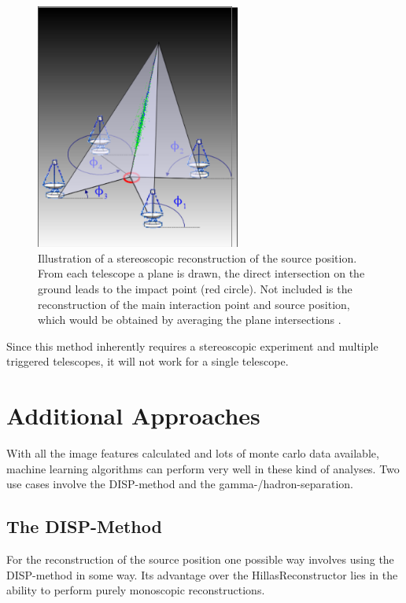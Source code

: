 \begin{figure}
	\centering
	\includegraphics[width=0.6\textwidth]{images/hillas_reco.png}
	\caption{Illustration of a stereoscopic reconstruction of the source position.
    From each telescope a plane is drawn, the direct intersection 
    on the ground leads to the impact point (red circle).
    Not included is the reconstruction of the main interaction point
    and source position, which would be obtained by averaging the plane
    intersections  \cite{hillas_reco}.}
	\label{fig:hillas_reconstructor}
\end{figure}

Since this method inherently requires a stereoscopic experiment
and multiple triggered telescopes, it will not work for a single telescope.




\section{Additional Approaches}
With all the image features calculated and lots of monte carlo
data available, machine learning algorithms can perform
very well in these kind of analyses.
Two use cases involve the DISP-method
and the gamma-/hadron-separation.

\subsection{The DISP-Method}
For the reconstruction of the source position
one possible way involves using the DISP-method in some way.
Its advantage over the HillasReconstructor lies in the ability to
perform purely monoscopic reconstructions.

